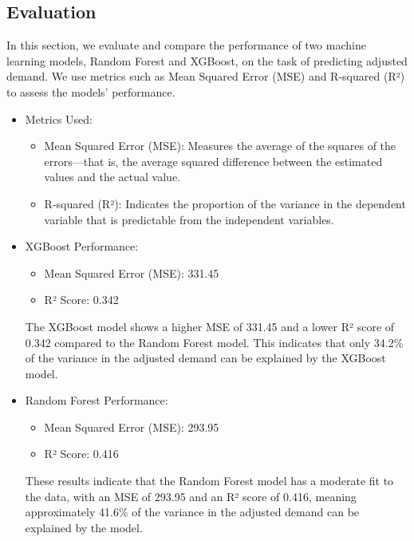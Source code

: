 \documentclass[letterpaper, 10 pt, conference]{ieeeconf}  %
\begin{document}
\subsection{Evaluation}
In this section, we evaluate and compare the performance of two machine learning models, Random Forest and XGBoost, on the task of predicting adjusted demand. We use metrics such as Mean Squared Error (MSE) and R-squared (R²) to assess the models' performance.
\begin{itemize}
        
        \item Metrics Used:
        \begin{itemize}
                \item Mean Squared Error (MSE): Measures the average of the squares of the errors—that is, the average squared difference between the estimated values and the actual value.  
                \item R-squared (R²): Indicates the proportion of the variance in the dependent variable that is predictable from the independent variables.
        \end{itemize}



        \item XGBoost Performance: 

        \begin{itemize}
                \item Mean Squared Error (MSE): 331.45
                \item R² Score: 0.342
        \end{itemize}
        
        The XGBoost model shows a higher MSE of 331.45 and a lower R² score of 0.342 compared to the Random Forest model. This indicates that only 34.2\% of the variance in the adjusted demand can be explained by the XGBoost model.

        \item Random Forest Performance: 
        
        \begin{itemize}
                \item Mean Squared Error (MSE): 293.95
                \item R² Score: 0.416
        \end{itemize}

        These results indicate that the Random Forest model has a moderate fit to the data, with an MSE of 293.95 and an R² score of 0.416, meaning approximately 41.6\% of the variance in the adjusted demand can be explained by the model.

\end{itemize}
\end{document}
